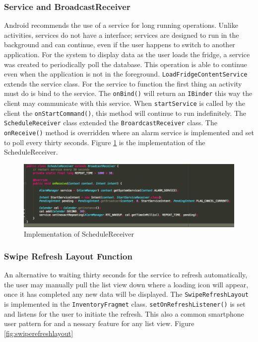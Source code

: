 \documentclass[a4paper, 11pt]{article}
\begin{document}
\subsubsection{Service and BroadcastReceiver}
Android recommends the use of a service for long running operations. Unlike activities, services do not have a interface; services are designed to run in the background and can continue, even if the user happens to switch to another application.
For the system to display data as the user loads the fridge, a service was created to periodically poll the database. This operation is able to continue even when the application is not in the foreground. \texttt{LoadFridgeContentService} extends the service class. For the service to function the first thing an activity must do is bind to the service. The \texttt{onBind()} will return an \texttt{IBinder} this way the client may communicate with this service. When \texttt{startService} is called by the client the \texttt{onStartCommand()}, this method will continue to run indefinitely. The \texttt{ScheduleReceiver} class extended the \texttt{BroardcastReceiver} class. The \texttt{onReceive()} method is overridden where an alarm service is implemented and set to poll every thirty seconds. Figure \ref{fig:service} is the implementation of the ScheduleReceiver.

\vspace{\baselineskip}

\begin{figure}[!htbp]
\centering
\includegraphics[width=\textwidth]{service}
\caption{Implementation of ScheduleReceiver} \label{fig:service}
\end{figure}

\subsubsection{Swipe Refresh Layout Function}
An alternative to waiting thirty seconds for the service to refresh automatically, the user may manually pull the list view down where a loading icon will appear, once it has completed any new data will be displayed. The \texttt{SwipeRefreshLayout} is implemented in the \texttt{InventoryFragmet} class. \texttt{setOnRefreshListener()} is set and listens for the user to initiate the refresh. This also a common smartphone user pattern for and a nessary feature for any list view. Figure \ref{fig:swiperefreshlayout}
\vspace{\baselineskip}
\end{document}
